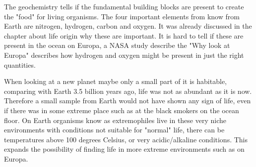 The geochemistry tells if the fundamental building blocks are present to create the "food" for living organisms. The four important elements from know from Earth are nitrogen, hydrogen, carbon and oxygen. It was already discussed in the chapter about life origin why these are important.  It is hard to tell if these are present in the ocean on Europa, a NASA study describe the "Why look at Europa" describes how hydrogen and oxygen might be present in just the right quantities.

When looking at a new planet maybe only a small part of it is habitable, comparing with Earth 3.5 billion years ago, life was not as abundant as it is now. Therefore a small sample from Earth would not have shown any sign of life, even if there was in some extreme place such as at the black smokers on the ocean floor. On Earth organisms know as extremophiles live in these very niche environments with conditions not suitable for "normal" life, there can be temperatures above 100 degrees Celsius, or very acidic/alkaline conditions. This expands the possibility of finding life in more extreme environments such as on Europa.

